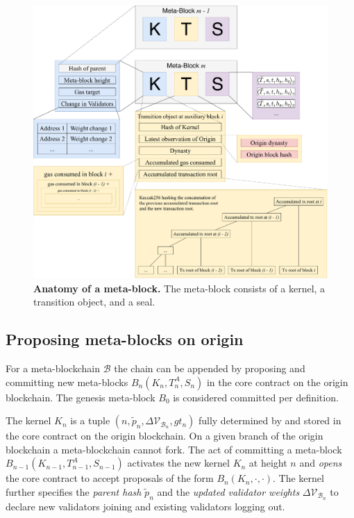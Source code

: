 \documentclass[12pt,a4paper]{article}
\begin{document}
\begin{figure}
    \centering
	\includegraphics[width=\textwidth]{meta_block}
	\caption{\textbf{Anatomy of a meta-block.}
		The meta-block consists of a kernel, a transition object, and a seal.
	}
	\label{fig:meta_block}
\end{figure}

\subsection{Proposing meta-blocks on origin}
\label{proposing_metablocks}

For a meta-blockchain $\mathcal{B}$ the chain can be appended by proposing and committing new meta-blocks $B_n(K_n, T^A_n, S_n)$ in the core contract on the origin block\-chain.
The genesis meta-block $B_0$ is considered committed per definition.

The kernel $K_n$ is a tuple $(n, \tilde{p}_n, \Delta\mathcal{V}_{\mathcal{B}_n}, gt_n)$ fully determined by and stored in the core contract on the origin blockchain.
On a given branch of the origin blockchain a meta-blockchain cannot fork.
The act of committing a meta-block $B_{n-1}(K_{n-1}, T^A_{n-1}, S_{n-1})$ activates the new kernel $K_n$ at height $n$ and \emph{opens} the core contract to accept proposals of the form $B_n(K_n, \cdot, \cdot)$.
The kernel further specifies the \emph{parent hash} $\tilde{p}_n$ and the \emph{updated validator weights} $\Delta\mathcal{V}_{\mathcal{B}_n}$ to declare new validators joining and existing validators logging out.
\end{document}

